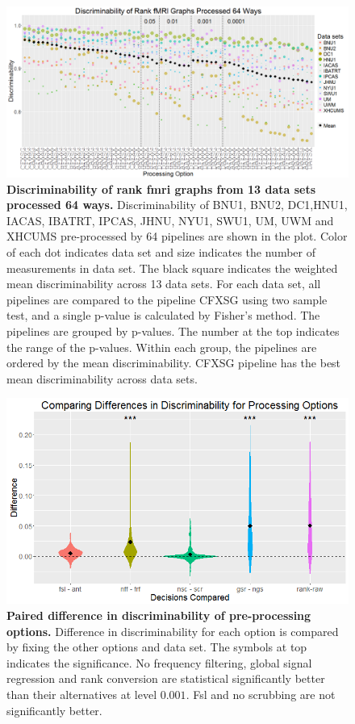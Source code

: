 \documentclass{article}
\begin{document}
\newpage
\begin{figure}[H]
	\includegraphics[width=\linewidth]{../Figs/fmri_rank_pv_v2.png}
	\caption{{\bf Discriminability of rank fmri graphs from 13 data sets processed 64 ways.}  Discriminability of BNU1, BNU2, DC1,HNU1, IACAS, IBATRT, IPCAS, JHNU, NYU1, SWU1, UM, UWM and XHCUMS pre-processed by 64 pipelines are shown in the plot. Color of each dot indicates data set and size indicates the number of measurements in data set. The black square indicates the weighted mean discriminability across 13 data sets.  For each data set, all pipelines are compared to the pipeline CFXSG using two sample test, and a single p-value is calculated by Fisher's method. The pipelines are grouped by p-values. The number at the top indicates the range of the p-values. Within each group, the pipelines are ordered by the mean discriminability. CFXSG pipeline has the best mean discriminability across data sets.}
	\label{fig:pipes}
\end{figure}

\begin{figure}[H]
	\includegraphics[width=\linewidth]{../Figs/mri_decs.png}
	\caption{{ \bf Paired difference in discriminability of pre-processing options.} Difference in discriminability for each option is compared by fixing the other options and data set. The symbols at top indicates the significance. No frequency filtering, global signal regression and rank conversion are statistical significantly better than their alternatives at level $0.001$. Fsl and no scrubbing are not significantly better. }
	\label{fig:decs}
\end{figure}
\end{document}
